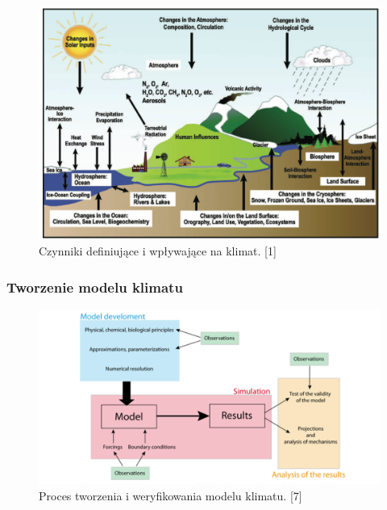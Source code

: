 \documentclass{beamer}
\begin{document}
\begin{frame}
	\frametitle{}
	\begin{figure}[h]
		\begin{center}
			\includegraphics[width=0.9\linewidth]{images/Figure1}
			\caption{Czynniki definiujące i wpływające na klimat. [1]}
		\end{center}
	\end{figure}
\end{frame}

\begin{frame}
	\frametitle{Tworzenie modelu klimatu}
	\begin{figure}[h]
		\begin{center}
			\includegraphics[width=1.0\linewidth]{images/Figure9}
			\caption{Proces tworzenia i weryfikowania modelu klimatu. [7]}
		\end{center}
	\end{figure}
\end{frame}
\end{document}
